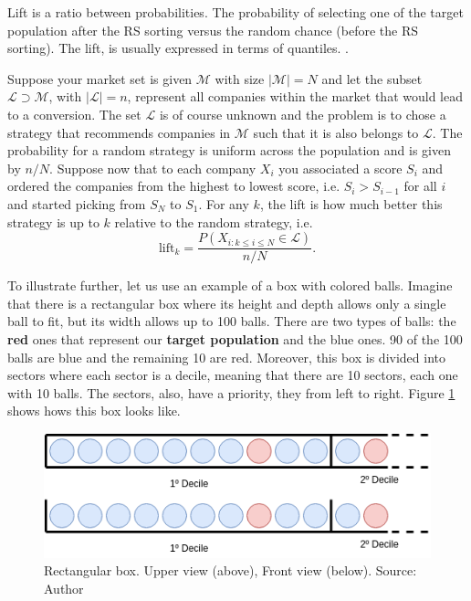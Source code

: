 Lift is a ratio between probabilities. The probability of selecting one of the target population after the RS sorting versus the random  chance (before the RS sorting). The lift, is usually expressed in terms of quantiles. \cite{LiftAnalysisADataScientistsSecretWeapon}.

Suppose your market set is given $\mathcal M$ with size $|\mathcal M |\!=\!N$ and let the subset $\mathcal L \supset \mathcal M $, with $|\mathcal L|\!=\!n$, represent all companies within the market that would lead to a conversion. The set $\mathcal L$ is of course unknown and the problem is to chose a strategy that recommends companies in $\mathcal M$ such that it is also belongs to $\mathcal L$. The probability for a random strategy is uniform across the population and is given by $n/N$. Suppose now that to each company $X_i$ you associated a score $S_i$ and ordered the companies from the highest to lowest score, i.e. $S_i>S_{i-1}$ for all $i$ and started picking from $S_N$ to $S_1$. For any $k$, the lift is how much better this strategy is up to $k$ relative to the random strategy, i.e.
\begin{equation}
    \mathrm{lift}_k = \frac{P(X_{i:k\leq i\leq N}\in \mathcal L)}{n/N}.
\end{equation}


To illustrate further, let us use an example of a box with colored balls. Imagine that there is a rectangular box where its height and depth allows only a single ball to fit, but its width allows up to 100 balls. There are two types of balls: the \textbf{red} ones that represent our \textbf{target population} and the blue ones. 90 of the 100 balls are blue and the remaining 10 are red. Moreover, this box is divided into sectors where each sector is a decile, meaning that there are 10 sectors, each one with 10 balls. The sectors, also, have a priority, they from left to right. Figure \ref{fig:rec-box} shows hows this box looks like.

\begin{figure}[h]
   \centering
   \includegraphics[width=\linewidth]{fig/ch2-rec-box.png}
   \caption{Rectangular box. Upper view (above), Front view (below).  Source: Author}
   \label{fig:rec-box}
\end{figure}

